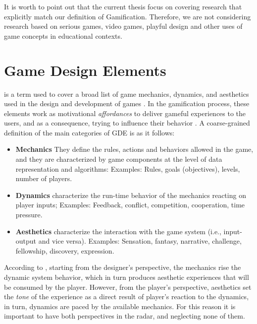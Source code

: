It is worth to point out that the current thesis focus on covering
research that explicitly match our definition of Gamification.
Therefore, we are not considering research based on serious games,
video games, playful design and other uses of game concepts in
educational contexts.

\section{Game Design Elements}
 is a term used to cover a broad list of game mechanics, dynamics, and aesthetics used in the design and development of games \cite{The_Gamification_of_Learning_and_Instruction,Gamification_of_Collaborative_Learning}. In the gamification process, these elements work as motivational \textit{affordances} to deliver gameful experiences to the users, and as a consequence, trying to influence their behavior \cite{Does_Gamification_Work}. 
A coarse-grained definition of the main categories of GDE is as it follows: 

\begin{itemize}
\item \textbf{Mechanics} They define the rules, actions and behaviors allowed in the game, and they are characterized by game components at the level of data representation and algorithms:
\subitem Examples: Rules, goals (objectives), levels, number of players. 
\item \textbf{Dynamics} characterize the run-time behavior of the mechanics reacting on player inputs;
\subitem Examples: Feedback, conflict, competition, cooperation, time pressure.
\item \textbf{Aesthetics} characterize the interaction with the game system (i.e., input-output and vice versa).
\subitem Examples: Sensation, fantasy, narrative, challenge, fellowship, discovery, expression.
\end{itemize}

According to \citeauthor{hunicke2004}, starting from the designer’s perspective,
the mechanics rise the dynamic system behavior, which in turn produces aesthetic experiences that will be consumed by the player.
However, from the player’s perspective, aesthetics set the \textit{tone} of the experience as a direct result of player's reaction to the dynamics, in turn, dynamics are paced by the available mechanics. For this reason it is important to have both perspectives in the radar, and neglecting none of them.

